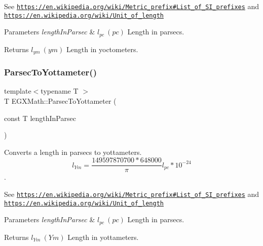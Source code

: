 See \href{https://en.wikipedia.org/wiki/Metric_prefix#List_of_SI_prefixes}{\tt https\+://en.\+wikipedia.\+org/wiki/\+Metric\+\_\+prefix\#\+List\+\_\+of\+\_\+\+S\+I\+\_\+prefixes} and \href{https://en.wikipedia.org/wiki/Unit_of_length}{\tt https\+://en.\+wikipedia.\+org/wiki/\+Unit\+\_\+of\+\_\+length} 
\begin{DoxyParams}{Parameters}
{\em length\+In\+Parsec} & $ l_{pc}\ (pc)$ Length in parsecs. \\
\hline
\end{DoxyParams}
\begin{DoxyReturn}{Returns}
$ l_{ym}\ (ym)$ Length in yoctometers. 
\end{DoxyReturn}
\mbox{\label{group___e_g_x_math-_conversions-_length_conversions-_astronomical-_parsec-_s_i_ga8a5381e5fcaa36d464b5bdf17e238ef2}} 
\subsubsection{\texorpdfstring{Parsec\+To\+Yottameter()}{ParsecToYottameter()}}
{\footnotesize\ttfamily template$<$typename T $>$ \\
T E\+G\+X\+Math\+::\+Parsec\+To\+Yottameter (\begin{DoxyParamCaption}\item[{const T}]{length\+In\+Parsec }\end{DoxyParamCaption})}



Converts a length in parsecs to yottameters. \[ l_{Ym}=\frac{149597870700 * 648000}{\pi}l_{pc} * 10^{-24} \]. 

See \href{https://en.wikipedia.org/wiki/Metric_prefix#List_of_SI_prefixes}{\tt https\+://en.\+wikipedia.\+org/wiki/\+Metric\+\_\+prefix\#\+List\+\_\+of\+\_\+\+S\+I\+\_\+prefixes} and \href{https://en.wikipedia.org/wiki/Unit_of_length}{\tt https\+://en.\+wikipedia.\+org/wiki/\+Unit\+\_\+of\+\_\+length} 
\begin{DoxyParams}{Parameters}
{\em length\+In\+Parsec} & $ l_{pc}\ (pc)$ Length in parsecs. \\
\hline
\end{DoxyParams}
\begin{DoxyReturn}{Returns}
$ l_{Ym}\ (Ym)$ Length in yottameters. 
\end{DoxyReturn}
\mbox{\label{group___e_g_x_math-_conversions-_length_conversions-_astronomical-_parsec-_s_i_ga3334cc4dbcddb1ae43e821f518bb56cb}} 
